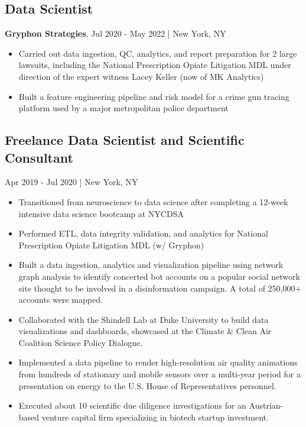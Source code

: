 \documentclass[11pt]{article}
\newenvironment{myitemize}
{ \begin{itemize}
	\setlength{\itemsep}{0pt}
	\setlength{\parskip}{0pt}
	\setlength{\parsep}{0pt}     }
{ \end{itemize}                  }
\begin{document}
\subsection*{Data Scientist}
{\bfseries Gryphon Strategies}, Jul 2020 - May 2022 | New York, NY
\begin{myitemize}
	\item Carried out data ingestion, QC, analytics, and report preparation for 2 large lawsuits, including the National Prescription Opiate Litigation MDL under direction of the expert witness Lacey Keller (now of MK Analytics)
	\item Built a feature engineering pipeline and risk model for a crime gun tracing platform used by a major metropolitan police department
\end{myitemize}

\subsection*{Freelance Data Scientist and Scientific Consultant} Apr 2019 - Jul 2020 | New York, NY
\begin{myitemize}
	\item Transitioned from neuroscience to data science after completing a 12-week intensive data science bootcamp at NYCDSA 
	\item Performed ETL, data integrity validation, and analytics for National Prescription Opiate Litigation MDL (w/ Gryphon)
	\item Built a data ingestion, analytics and visualization pipeline using network graph analysis to identify concerted bot accounts on a popular social network site thought to be involved in a disinformation campaign. A total of 250,000+ accounts were mapped.
	\item Collaborated with the Shindell Lab at Duke University to build data visualizations and dashboards, showcased at the Climate \& Clean Air Coalition Science Policy Dialogue.
	\item Implemented a data pipeline to render high-resolution air quality animations from hundreds of stationary and mobile sensors over a multi-year period for a presentation on energy to the U.S. House of Representatives personnel. 
	\item Executed about 10 scientific due diligence investigations for an Austrian-based venture capital firm specializing in biotech startup investment.
\end{myitemize}
\end{document}
